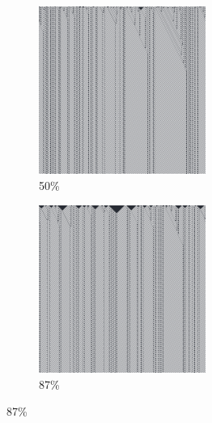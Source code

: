 \documentclass[12pt, fleqn]{report}                             %
\theoremstyle{break}                                            %
\begin{document}
\begin{figure}[ht!]
\begin{subfigure}[b]{0.4\linewidth}
          \includegraphics[width=0.6\textwidth]{Images/62/c.png}
          \caption{50\%}
        \end{subfigure}
        \begin{subfigure}[b]{0.4\linewidth}
          \includegraphics[width=0.6\textwidth]{Images/62/d.png}
          \caption{87\%}
        \end{subfigure}
      \end{figure}
\end{document}
